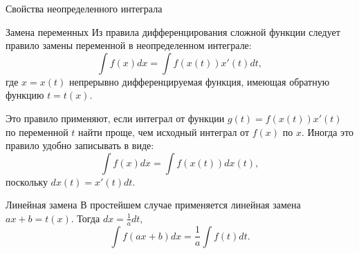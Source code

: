 \documentclass[8pt]{beamer}
\begin{document}

\begin{frame}{Свойства неопределенного интеграла}
\begin{block}{Замена переменных}
Из правила дифференцирования сложной функции следует правило замены переменной в неопределенном интеграле:
$$\int f(x) dx = \int f(x(t)) x'(t) dt ,$$
где $x=x(t)$ непрерывно дифференцируемая функция, имеющая обратную функцию $t=t(x)$.
\end{block}
Это правило применяют, если интеграл от функции $g(t) = f(x(t))x'(t)$ по переменной $t$ найти проще, чем исходный интеграл от $f(x)$ по $x$. Иногда это правило удобно записывать в виде:
$$\int f(x) dx = \int f(x(t)) dx(t),$$
поскольку $dx(t) = x'(t)dt$.
\begin{block}{Линейная замена}
В простейшем случае применяется линейная замена $a x+b=t(x)$. Тогда $dx=\frac{1}{a}dt$,
$$\int f(a x+b)dx =\frac{1}{a} \int f(t) dt.$$
\end{block}
\end{frame}
\end{document}
